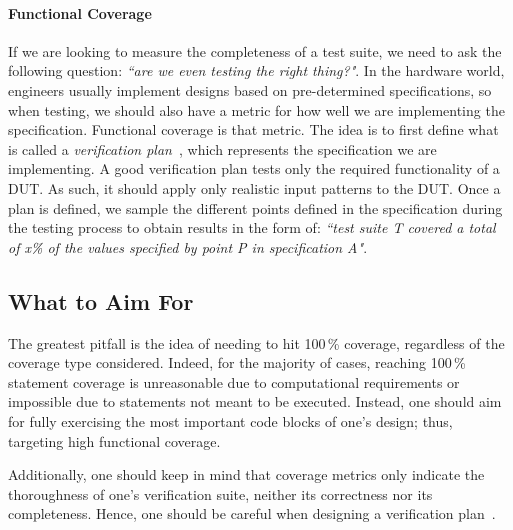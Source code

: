 \documentclass[conference]{IEEEtran}
\begin{document}
\paragraph{Functional Coverage} If we are looking to measure the completeness of a test suite, we need to ask the following question: \textit{``are we even testing the right thing?"}. 
In the hardware world, engineers usually implement designs based on pre-determined specifications, so when testing, we should also have a metric for how well we are implementing the specification. 
Functional coverage is that metric. 
The idea is to first define what is called a \textit{verification plan}~\cite{spear2008systemverilog}, which represents the specification we are implementing. 
A good verification plan tests only the required functionality of a DUT. As such, it should apply only 
realistic input patterns to the DUT.
Once a plan is defined, we sample the different points defined in the specification during the testing process to obtain results in the form of: \textit{``test suite T covered a total of x\% of the values specified by point P in specification A"}. 

\subsection{What to Aim For}
The greatest pitfall is the idea of needing to hit 100\,\% coverage, regardless of the coverage type considered. Indeed, for the majority of cases, reaching 100\,\% statement coverage is unreasonable due to computational requirements or impossible due to statements not meant to be executed. Instead, one should aim for fully exercising the most important code blocks of one's design; thus, targeting high functional coverage.

Additionally, one should keep in mind that coverage metrics only indicate the thoroughness of one's verification suite, neither its correctness nor its completeness. Hence, one should be careful when designing a verification plan~\cite{hdlverify}.
\end{document}
